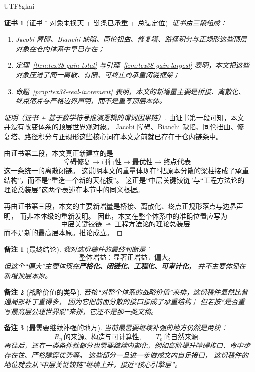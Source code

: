 \documentclass[12pt]{article}
\newtheorem{remark}{备注}[section]
\newtheorem{Certificate}{证书}[section]
\begin{document}
\begin{CJK*}{UTF8}{gkai}
\begin{Certificate}[证书：对象未换天 + 链条已承重 + 总装定位]
\label{cert:tex38-position}
证书由三段组成：
\begin{enumerate}
  \item Jacobi 障碍、Bianchi 缺陷、同伦扭曲、修复塔、路径积分与正规形这些顶层对象在仓内体系中早已存在；
  \item 定理~\ref{thm:tex38-gain-total} 与引理~\ref{lem:tex38-gain-largest} 表明，本文把这些对象压进了同一离散、有限、可终止的承重闭链框架；
  \item 命题~\ref{prop:tex38-real-increment} 表明，本文的新增量主要是桥接、离散化、终点落点与严格边界声明，而不是重写顶层本体。
\end{enumerate}
\end{Certificate}

\begin{proof}[证明（证书 + 基于数学符号推演逻辑的谓词因果链）]
由证书第一段可知，本文并没有改变体系的顶层世界观对象。
Jacobi 障碍、Bianchi 缺陷、同伦扭曲、修复塔、路径积分与正规形这些核心词在本文之前就已存在于仓内链条中。

由证书第二段，本文真正新建立的是
\[
  \text{障碍修复}
  \to
  \text{可行性}
  \to
  \text{最优性}
  \to
  \text{终点代表}
\]
这一条统一的离散闭链。
这说明本文的重量体现在“把原本分散的梁柱接成了承重结构”，而不是“重造一个新的天花板”。
这正是“中层关键铰链”与“工程方法论的理论总装层”这两个表述在本节中的同义根据。

再由证书第三段，本文的主要新增量是桥接、离散化、终点正规形落点与边界声明，
而非本体级的重新发明。
因此，本文在整个体系中的准确位置应写为
\[
  \text{中层关键铰链}
  \;\cong\;
  \text{工程方法论的理论总装层},
\]
而不是新的最高层本原。推论成立。
\end{proof}

\begin{remark}[最终结论]
我对这份稿件的最终判断是：
\[
  \boxed{
    \text{整体增益：显著正增益，偏大。}
  }
\]
但这个“偏大”主要体现在\textbf{严格化、闭链化、工程化、可审计化}，
并不主要体现在新增顶层本原。
\end{remark}

\begin{remark}[战略价值的类型]
若按“对整个体系的战略价值”来排，这份稿件显然比普通局部补丁重得多，
因为它把前面分散的接口接成了承重结构；
但若按“是否重写最高层公理世界观”来排，它还不是那一类文稿。
\end{remark}

\begin{remark}[最需要继续补强的地方]
当前最需要继续补强的地方仍然是两块：
\[
  R_n\ \text{的来源、构造与可计算性},
  \qquad
  T_e\ \text{的自然来源}.
\]
再往后，还有一类条件性部分也需要继续内部化，例如高阶提升障碍接口、命中步存在性、严格隧穿优势等。
这些部分一旦进一步做成文内自足接口，
这份稿件的地位就会从“中层关键铰链”继续上升，接近“核心引擎层”。
\end{remark}


\end{CJK*}
\end{document}
